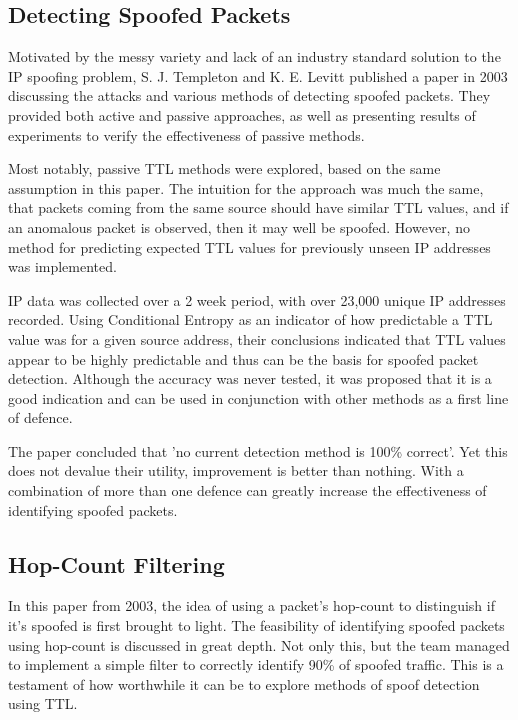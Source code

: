 \documentclass[12pt,twoside]{article}
\begin{document}
\subsection{Detecting Spoofed Packets \cite{dsp}}

Motivated by the messy variety and lack of an industry standard solution to the IP spoofing problem, S. J. Templeton and K. E. Levitt published a paper in 2003 discussing the attacks and various methods of detecting spoofed packets. They provided both active and passive approaches, as well as presenting results of experiments to verify the effectiveness of passive methods. 

Most notably, passive TTL methods were explored, based on the same assumption in this paper. The intuition for the approach was much the same, that packets coming from the same source should have similar TTL values, and if an anomalous packet is observed, then it may well be spoofed. However, no method for predicting expected TTL values for previously unseen IP addresses was implemented.

IP data was collected over a 2 week period, with over 23,000 unique IP addresses recorded. Using Conditional Entropy as an indicator of how predictable a TTL value was for a given source address, their conclusions indicated that TTL values appear to be highly predictable and thus can be the basis for spoofed packet detection. Although the accuracy was never tested, it was proposed that it is a good indication and can be used in conjunction with other methods as a first line of defence.

The paper concluded that 'no current detection method is 100\% correct'. Yet this does not devalue their utility, improvement is better than nothing. With a combination of more than one defence can greatly increase the effectiveness of identifying spoofed packets.

\subsection{Hop-Count Filtering \cite{hcf}} \label{hcf}
In this paper from 2003, the idea of using a packet's hop-count to distinguish if it's spoofed is first brought to light. The feasibility of identifying spoofed packets using hop-count is discussed in great depth. Not only this, but the team managed to implement a simple filter to correctly identify 90\% of spoofed traffic. This is a testament of how worthwhile it can be to explore methods of spoof detection using TTL.
\end{document}
